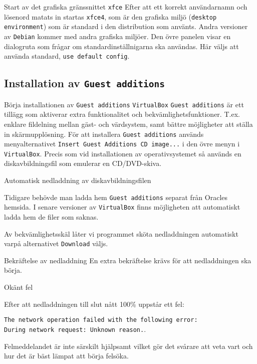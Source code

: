            {Start av det grafiska gränssnittet \texttt{xfce}}
           {Efter att ett korrekt användarnamn och lösenord matats in startas
            \texttt{xfce4}, som är den grafiska miljö
            (\texttt{desktop environment}) som är standard i den distribution
            som använts. Andra versioner av \texttt{Debian} kommer med andra
            grafiska miljöer. Den övre panelen visar en dialogruta som frågar
            om standardinställnigarna ska användas. Här väljs att använda
            standard, \texttt{use default config}.}
           {}


\subsection{Installation av \texttt{Guest additions}}

           {Börja installationen av \texttt{Guest additions}}
           {\texttt{VirtualBox} \texttt{Guest additions} är ett tillägg som
            aktiverar extra funktionalitet och bekvämlighetsfunktioner. T.ex.
            enklare fildelning mellan gäst- och värdsystem, samt bättre
            möjligheter att ställa in skärmupplösning. För att installera
            \texttt{Guest additions} används menyalternativet
            \texttt{Insert Guest Additions CD image...} i den övre menyn i
            \texttt{VirtualBox}. Precis som vid installationen av operativsystemet
            så används en diskavbildningsfil som emulerar en CD/DVD-skiva.}
           {}

           {Automatisk nedladdning av diskavbildningsfilen}
           {Tidigare behövde man ladda hem \texttt{Guest additions} separat från
            Oracles hemsida. I senare versioner av \texttt{VirtualBox} finns
            möjligheten att automatiskt ladda hem de filer som saknas.
            \par Av bekvämlighetsskäl låter vi programmet sköta nedladdningen
            automatiskt varpå alternativet \texttt{Download} väljs.}
           {}

           {Bekräftelse av nedladdning}
           {En extra bekräftelse krävs för att nedladdningen ska börja.}
           {}

           {Okänt fel}
           {Efter att nedladdningen till slut nått 100\% uppstår ett fel:
            \par \texttt{The network operation failed with the following error:
            \\ During network request: Unknown reason.}.
            \par Felmeddelandet är inte särskilt hjälpsamt vilket gör det
            svårare att veta vart och hur det är bäst lämpat att börja felsöka.}
           {}


